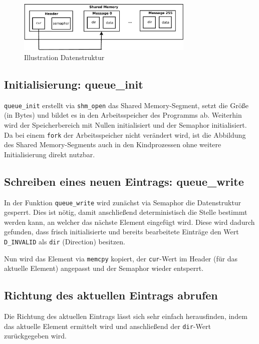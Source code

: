 \documentclass[12pt, a4paper]{scrartcl}
\begin{document}
\begin{figure}[h!]
\centering
\caption{Illustration Datenstruktur}
\includegraphics[width=0.75\textwidth]{a4-crop}
\end{figure}

\subsection{Initialisierung: queue\_init}

\texttt{queue\_init} erstellt via \texttt{shm\_open} das Shared Memory-Segment,
setzt die Größe (in Bytes) und bildet es in den Arbeitsspeicher des Programms
ab. Weiterhin wird der Speicherbereich mit Nullen initialisiert und der
Semaphor initialisiert. Da bei einem \texttt{fork} der Arbeitsspeicher nicht
verändert wird, ist die Abbildung des Shared Memory-Segments auch in den
Kindprozessen ohne weitere Initialisierung direkt nutzbar.

\subsection{Schreiben eines neuen Eintrags: queue\_write}

In der Funktion \texttt{queue\_write} wird zunächst via Semaphor die
Datenstruktur gesperrt. Dies ist nötig, damit anschließend deterministisch die
Stelle bestimmt werden kann, an welcher das nächste Element eingefügt wird.
Diese wird dadurch gefunden, dass frisch initialisierte und bereits bearbeitete
Einträge den Wert \texttt{D\_INVALID} als \texttt{dir} (Direction) besitzen.
\np

Nun wird das Element via \texttt{memcpy} kopiert, der \texttt{cur}-Wert im
Header (für das aktuelle Element) angepasst und der Semaphor wieder entsperrt.

\subsection{Richtung des aktuellen Eintrags abrufen}

Die Richtung des aktuellen Eintrags lässt sich sehr einfach herausfinden, indem
das aktuelle Element ermittelt wird und anschließend der \texttt{dir}-Wert
zurückgegeben wird.
\np
\end{document}
